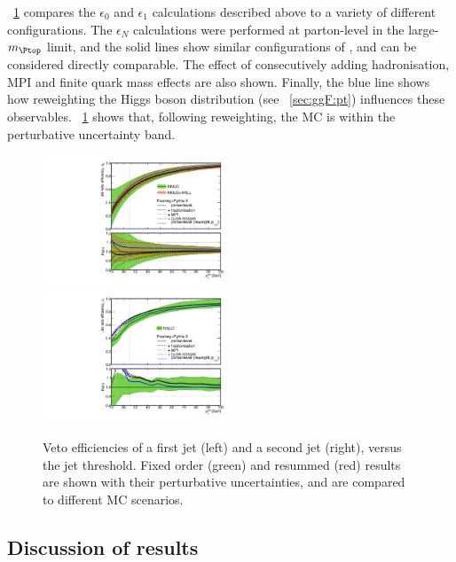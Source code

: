 \Figure~\ref{fig:ggF:jve_compare} compares the $\epsilon_0$ and $\epsilon_1$ calculations 
described above to a variety of different  configurations.
The $\epsilon_N$ calculations were performed at parton-level in the large-$m_{\Ptop}$ 
limit, and the solid lines show similar configurations of , 
and can be considered directly comparable. The effect of consecutively adding 
hadronisation, MPI and finite quark mass effects are also shown. Finally, the blue line 
shows how reweighting the Higgs boson \pt distribution (see \Section~\ref{sec:ggF:pt}) 
influences these observables. \Figure~\ref{fig:ggF:jve_compare} shows that, following 
\ptH reweighting, the MC is within the perturbative uncertainty band.

\begin{figure}[t]
	\includegraphics[width=0.495\textwidth]{tex/signal/eps0_jve_compare}
	\hfill
	\includegraphics[width=0.495\textwidth]{tex/signal/eps1_jve_compare}
	\caption{Veto efficiencies of a first jet (left) and a second jet (right), versus the 
	jet \pt threshold. Fixed order (green) and resummed (red) results are shown with their 
	perturbative uncertainties, and are compared to different MC scenarios.}
	\label{fig:ggF:jve_compare}
\end{figure}





\subsection{Discussion of results}

